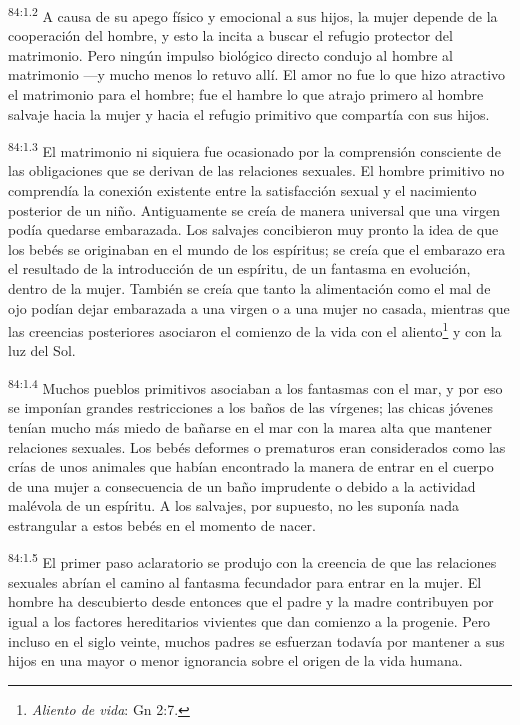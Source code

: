 \par
\textsuperscript{84:1.2} A causa de su apego físico y emocional a sus hijos, la mujer depende de la cooperación del hombre, y esto la incita a buscar el refugio protector del matrimonio. Pero ningún impulso biológico directo condujo al hombre al matrimonio ---y mucho menos lo retuvo allí. El amor no fue lo que hizo atractivo el matrimonio para el hombre; fue el hambre lo que atrajo primero al hombre salvaje hacia la mujer y hacia el refugio primitivo que compartía con sus hijos.

\par
\textsuperscript{84:1.3} El matrimonio ni siquiera fue ocasionado por la comprensión consciente de las obligaciones que se derivan de las relaciones sexuales. El hombre primitivo no comprendía la conexión existente entre la satisfacción sexual y el nacimiento posterior de un niño. Antiguamente se creía de manera universal que una virgen podía quedarse embarazada. Los salvajes concibieron muy pronto la idea de que los bebés se originaban en el mundo de los espíritus; se creía que el embarazo era el resultado de la introducción de un espíritu, de un fantasma en evolución, dentro de la mujer. También se creía que tanto la alimentación como el mal de ojo podían dejar embarazada a una virgen o a una mujer no casada, mientras que las creencias posteriores asociaron el comienzo de la vida con el aliento\footnote{\textit{Aliento de vida}: Gn 2:7.} y con la luz del Sol.

\par
\textsuperscript{84:1.4} Muchos pueblos primitivos asociaban a los fantasmas con el mar, y por eso se imponían grandes restricciones a los baños de las vírgenes; las chicas jóvenes tenían mucho más miedo de bañarse en el mar con la marea alta que mantener relaciones sexuales. Los bebés deformes o prematuros eran considerados como las crías de unos animales que habían encontrado la manera de entrar en el cuerpo de una mujer a consecuencia de un baño imprudente o debido a la actividad malévola de un espíritu. A los salvajes, por supuesto, no les suponía nada estrangular a estos bebés en el momento de nacer.

\par
\textsuperscript{84:1.5} El primer paso aclaratorio se produjo con la creencia de que las relaciones sexuales abrían el camino al fantasma fecundador para entrar en la mujer. El hombre ha descubierto desde entonces que el padre y la madre contribuyen por igual a los factores hereditarios vivientes que dan comienzo a la progenie. Pero incluso en el siglo veinte, muchos padres se esfuerzan todavía por mantener a sus hijos en una mayor o menor ignorancia sobre el origen de la vida humana.

